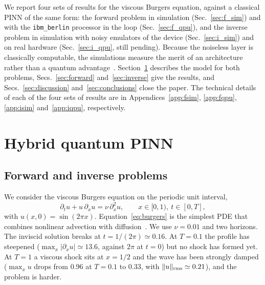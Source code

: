 \documentclass[floatfix,aps,pra,twocolumn,superscriptaddress,10pt,nofootinbib]{revtex4-2}
\begin{document}
We report four sets of results for the viscous Burgers equation, against a classical PINN of the same form: the forward problem in simulation (Sec.~\ref{sec:f_sim}) and with the \texttt{ibm\_berlin} processor in the loop (Sec.~\ref{sec:f_qpu}), and the inverse problem in simulation with noisy emulators of the device (Sec.~\ref{sec:i_sim}) and on real hardware (Sec.~\ref{sec:i_qpu}, still pending). Because the noiseless layer is classically computable, the simulations measure the merit of an architecture rather than a quantum advantage~\cite{schreiber2023classical}. Section~\ref{sec:hqpinn} describes the model for both problems, Secs.~\ref{sec:forward} and~\ref{sec:inverse} give the results, and Secs.~\ref{sec:discussion} and~\ref{sec:conclusions} close the paper. The technical details of each of the four sets of results are in Appendices~\ref{app:fsim}, \ref{app:fqpu}, \ref{app:isim} and~\ref{app:iqpu}, respectively.

\section{Hybrid quantum PINN}\label{sec:hqpinn}
\subsection{Forward and inverse problems}\label{sec:problem}
We consider the viscous Burgers equation on the periodic unit interval,
\begin{equation}
  \partial_t u + u\,\partial_x u = \nu\,\partial_x^2 u,\qquad x\in[0,1),\ t\in[0,T],
  \label{eq:burgers}
\end{equation}
with $u(x,0)=\sin(2\pi x)$. Equation~\eqref{eq:burgers} is the simplest PDE that combines nonlinear advection with diffusion~\cite{basdevant1986spectral}. We use $\nu=0.01$ and two horizons. The inviscid solution breaks at $t=1/(2\pi)\simeq0.16$. At $T=0.1$ the profile has steepened ($\max_x|\partial_xu|\simeq13.6$, against $2\pi$ at $t=0$) but no shock has formed yet. At $T=1$ a viscous shock sits at $x=1/2$ and the wave has been strongly damped ($\max_xu$ drops from 0.96 at $T=0.1$ to 0.33, with $\|u\|_{\rm rms}\simeq0.21$), and the problem is harder.
\end{document}
